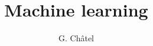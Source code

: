 \documentclass[9pt]{beamer}
\title{Machine learning}
\author{G. Châtel}
\date{}
\begin{document}
\begin{frame}

  \maketitle

\end{frame}
\end{document}
